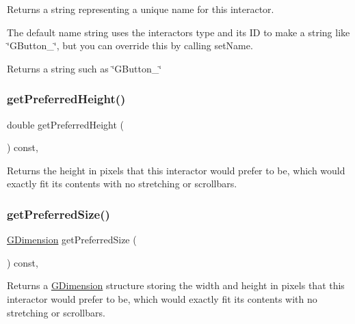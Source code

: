 Returns a string representing a unique name for this interactor. 

The default name string uses the interactor\textquotesingle{}s type and its ID to make a string like \char`\"{}\+G\+Button\+\_\char`\"{}, but you can override this by calling set\+Name. \begin{DoxyReturn}{Returns}
a string such as \char`\"{}\+G\+Button\+\_\char`\"{} 
\end{DoxyReturn}
\mbox{\label{classGInteractor_a747de0961653847bdc6615dbf756d715}} 
\subsubsection{\texorpdfstring{get\+Preferred\+Height()}{getPreferredHeight()}}
{\footnotesize\ttfamily double get\+Preferred\+Height (\begin{DoxyParamCaption}{ }\end{DoxyParamCaption}) const\hspace{0.3cm}{\ttfamily [virtual]}, {\ttfamily [inherited]}}



Returns the height in pixels that this interactor would prefer to be, which would exactly fit its contents with no stretching or scrollbars. 

\mbox{\label{classGInteractor_a4aabbee761d8e9116275401131b7ccd1}} 
\subsubsection{\texorpdfstring{get\+Preferred\+Size()}{getPreferredSize()}}
{\footnotesize\ttfamily \mbox{\hyperlink{classGDimension}{G\+Dimension}} get\+Preferred\+Size (\begin{DoxyParamCaption}{ }\end{DoxyParamCaption}) const\hspace{0.3cm}{\ttfamily [virtual]}, {\ttfamily [inherited]}}



Returns a \mbox{\hyperlink{classGDimension}{G\+Dimension}} structure storing the width and height in pixels that this interactor would prefer to be, which would exactly fit its contents with no stretching or scrollbars. 



